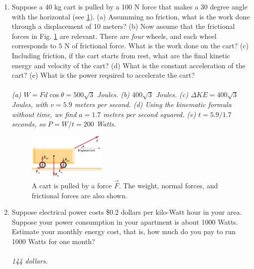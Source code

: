 \documentclass[10pt]{article}
\begin{document}
\begin{enumerate}
\item Suppose a 40 kg cart is pulled by a 100 N force that makes a 30 degree angle with the horizontal (see \ref{fig:cart}).  (a) Assumming no friction, what is the work done through a displacement of 10 meters? (b) Now assume that the frictional forces in Fig. \ref{fig:cart} are relevant.  There are \textit{four} wheels, and each wheel corresponds to $5$ N of frictional force.  What is the work done on the cart? (c) Including friction, if the cart starts from rest, what are the final kinetic energy and velocity of the cart? (d) What is the constant acceleration of the cart? (e) What is the power required to accelerate the cart? \\ \\
\textit{(a) $W = Fd\cos\theta = 500\sqrt{3}$ Joules.  (b) $400\sqrt{3}$ Joules.  (c) $\Delta KE = 400\sqrt{3}$ Joules, with $v = 5.9$ meters per second.  (d) Using the kinematic formula without time, we find $a = 1.7$ meters per second squared.  (e) $t = 5.9/1.7$ seconds, so $P = W/t = 200$ Watts.}
\begin{figure}
\centering
\includegraphics[width=0.35\textwidth]{figures/cart.jpeg}
\caption{\label{fig:cart} A cart is pulled by a force $\vec{F}$.  The weight, normal forces, and frictional forces are also shown.}
\end{figure}
\item Suppose electrical power costs \$0.2 dollars per kilo-Watt hour in your area.  Suppose your power consumption in your apartment is about 1000 Watts.  Estimate your monthly energy cost, that is, how much do you pay to run 1000 Watts for one month? \\ \\
\textit{144 dollars.}
\end{enumerate}
\end{document}
